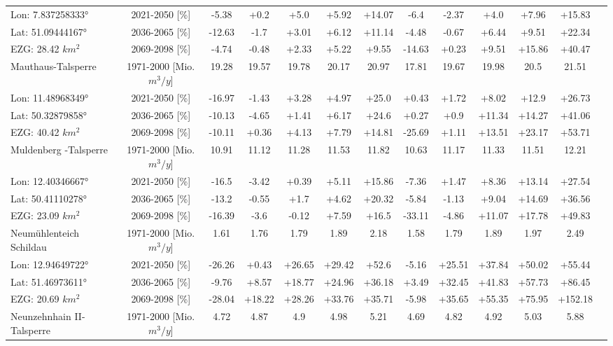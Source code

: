 \begin{longtable}{@{\extracolsep{\fill}}lc|ccccc||cccccc}
\cline{2-12} 
Lon: 7.837258333° & 2021-2050 [\%]  & -5.38 & +0.2 & +5.0 & +5.92 & +14.07 & -6.4 & -2.37 & +4.0 & +7.96 & +15.83\\ 
Lat: 51.09444167° & 2036-2065 [\%]  & -12.63 & -1.7 & +3.01 & +6.12 & +11.14 & -4.48 & -0.67 & +6.44 & +9.51 & +22.34\\ 
EZG: 28.42 $km^2$ & 2069-2098 [\%]  & -4.74 & -0.48 & +2.33 & +5.22 & +9.55 & -14.63 & +0.23 & +9.51 & +15.86 & +40.47\\ 
\hline 
Mauthaus-Talsperre & 1971-2000 [Mio. $m^3/y$]  & 19.28 & 19.57 & 19.78 & 20.17 & 20.97 & 17.81 & 19.67 & 19.98 & 20.5 & 21.51\\ 
\cline{2-12} 
Lon: 11.48968349° & 2021-2050 [\%]  & -16.97 & -1.43 & +3.28 & +4.97 & +25.0 & +0.43 & +1.72 & +8.02 & +12.9 & +26.73\\ 
Lat: 50.32879858° & 2036-2065 [\%]  & -10.13 & -4.65 & +1.41 & +6.17 & +24.6 & +0.27 & +0.9 & +11.34 & +14.27 & +41.06\\ 
EZG: 40.42 $km^2$ & 2069-2098 [\%]  & -10.11 & +0.36 & +4.13 & +7.79 & +14.81 & -25.69 & +1.11 & +13.51 & +23.17 & +53.71\\ 
\hline 
Muldenberg -Talsperre & 1971-2000 [Mio. $m^3/y$]  & 10.91 & 11.12 & 11.28 & 11.53 & 11.82 & 10.63 & 11.17 & 11.33 & 11.51 & 12.21\\ 
\cline{2-12} 
Lon: 12.40346667° & 2021-2050 [\%]  & -16.5 & -3.42 & +0.39 & +5.11 & +15.86 & -7.36 & +1.47 & +8.36 & +13.14 & +27.54\\ 
Lat: 50.41110278° & 2036-2065 [\%]  & -13.2 & -0.55 & +1.7 & +4.62 & +20.32 & -5.84 & -1.13 & +9.04 & +14.69 & +36.56\\ 
EZG: 23.09 $km^2$ & 2069-2098 [\%]  & -16.39 & -3.6 & -0.12 & +7.59 & +16.5 & -33.11 & -4.86 & +11.07 & +17.78 & +49.83\\ 
\hline 
Neumühlenteich Schildau & 1971-2000 [Mio. $m^3/y$]  & 1.61 & 1.76 & 1.79 & 1.89 & 2.18 & 1.58 & 1.79 & 1.89 & 1.97 & 2.49\\ 
\cline{2-12} 
Lon: 12.94649722° & 2021-2050 [\%]  & -26.26 & +0.43 & +26.65 & +29.42 & +52.6 & -5.16 & +25.51 & +37.84 & +50.02 & +55.44\\ 
Lat: 51.46973611° & 2036-2065 [\%]  & -9.76 & +8.57 & +18.77 & +24.96 & +36.18 & +3.49 & +32.45 & +41.83 & +57.73 & +86.45\\ 
EZG: 20.69 $km^2$ & 2069-2098 [\%]  & -28.04 & +18.22 & +28.26 & +33.76 & +35.71 & -5.98 & +35.65 & +55.35 & +75.95 & +152.18\\ 
\hline 
Neunzehnhain II-Talsperre & 1971-2000 [Mio. $m^3/y$]  & 4.72 & 4.87 & 4.9 & 4.98 & 5.21 & 4.69 & 4.82 & 4.92 & 5.03 & 5.88\\ 

\end{longtable}
